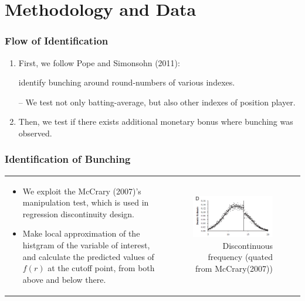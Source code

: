 \documentclass[dvipdfmx,12pt]{beamer}
\begin{document}
\section{Methodology and Data}
\begin{frame}\frametitle{Flow of Identification}
  \begin{enumerate}
    \item First, we follow Pope and Simonsohn (2011):

    identify bunching around round-numbers of various indexes.

    -- We test not only batting-average, but also other indexes of position player.

    \item Then, we test if there exists additional monetary bonus where bunching was observed.
  \end{enumerate}
\end{frame}

\begin{frame}\frametitle{Identification of Bunching}
  \begin{tabular}{lr}
    \begin{minipage}[H]{0.45\textwidth}
      \small
      \begin{itemize}
        \item We exploit the McCrary (2007)'s manipulation test, which is used in regression discontinuity design.

        \item Make local approximation of the histgram of the variable of interest, and calculate the predicted values of $f(r)$ at the cutoff point, from both above and below there.
      \end{itemize}
    \end{minipage}
    &
    \begin{minipage}[H]{0.5\textwidth}
      \begin{figure}
        \includegraphics[keepaspectratio, scale = 0.8]{graphs/McCrary_figD.png}
        \caption{Discontinuous frequency (quated from McCrary(2007))}
        \label{McC}
      \end{figure}
    \end{minipage}
  \end{tabular}
\end{frame}
\end{document}
